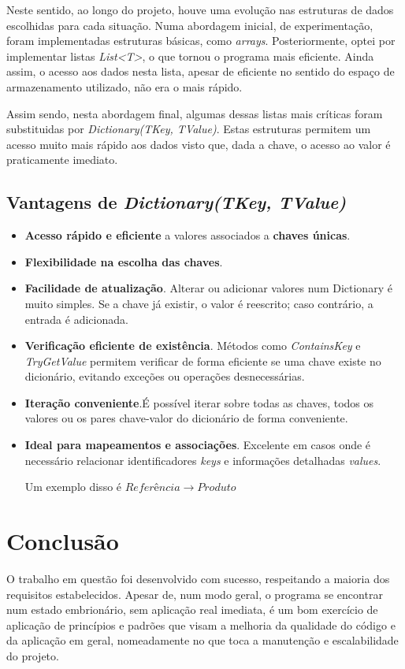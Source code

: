 \documentclass[11pt]{scrartcl} %
\begin{document}
Neste sentido, ao longo do projeto, houve uma evolução nas estruturas de dados escolhidas para cada situação. Numa abordagem inicial, de experimentação, foram implementadas estruturas básicas, como \textit{arrays}. Posteriormente, optei por implementar listas \textit{List<T>}, o que tornou o programa mais eficiente. Ainda assim, o acesso aos dados nesta lista, apesar de eficiente no sentido do espaço de armazenamento utilizado, não era o mais rápido. 

Assim sendo, nesta abordagem final, algumas dessas listas mais críticas foram substituidas por \textit{Dictionary(TKey, TValue)}. Estas estruturas permitem um acesso muito mais rápido aos dados visto que, dada a chave, o acesso ao valor é praticamente imediato.

\subsection{Vantagens de \textit{Dictionary(TKey, TValue)}}
\begin{itemize}
	\item\textbf{Acesso rápido e eficiente}  a valores associados a \textbf{chaves únicas}.
	\item \textbf{Flexibilidade na escolha das chaves}.
	\item \textbf{Facilidade de atualização}. Alterar ou adicionar valores num Dictionary é muito simples. Se a chave já existir, o valor é reescrito; caso contrário, a entrada é adicionada.
	\item \textbf{Verificação eficiente de existência}. Métodos como \textit{ContainsKey} e \textit{TryGetValue} permitem verificar de forma eficiente se uma chave existe no dicionário, evitando exceções ou operações desnecessárias.
	\item \textbf{Iteração conveniente}.É possível iterar sobre todas as chaves, todos os valores ou os pares chave-valor do dicionário de forma conveniente.
	\item \textbf{Ideal para mapeamentos e associações}. Excelente em casos onde é necessário relacionar identificadores \textit{keys} e informações detalhadas \textit{values}. 
	
	Um exemplo disso é \begin{math}
		Referência \rightarrow Produto
	\end{math} 
\end{itemize}


\section{Conclusão}
O trabalho em questão foi desenvolvido com sucesso, respeitando a maioria dos requisitos estabelecidos. Apesar de, num modo geral, o programa se encontrar num estado embrionário, sem aplicação real imediata, é um bom exercício de aplicação de princípios e padrões que visam a melhoria da qualidade do código e da aplicação em geral, nomeadamente no que toca a manutenção e escalabilidade do projeto.
\end{document}
